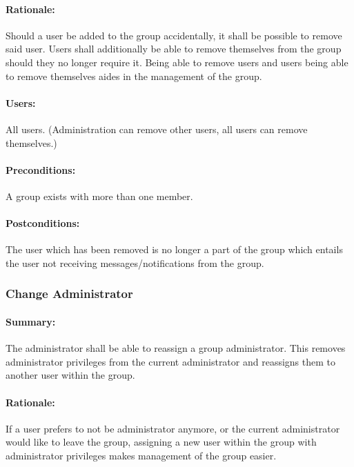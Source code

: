 \documentclass[11pt]{article}
\begin{document}
\paragraph{Rationale:}
Should a user be added to the group accidentally, it shall be possible to remove said user. Users shall additionally be able to remove themselves from the group should they no longer require it. Being able to remove users and users being able to remove themselves aides in the management of the group.
\paragraph{Users:}
All users. (Administration can remove other users, all users can remove themselves.)
\paragraph{Preconditions:}
A group exists with more than one member.
\paragraph{{Postconditions:}}
The user which has been removed is no longer a part of the group which entails the user not receiving messages/notifications from the group.

\subsubsection{Change Administrator} \label{UC-change-admin}
\paragraph{Summary:}
The administrator shall be able to reassign a group administrator. This removes administrator privileges from the current administrator and reassigns them to another user within the group.
\paragraph{Rationale:}
If a user prefers to not be administrator anymore, or the current administrator would like to leave the group, assigning a new user within the group with administrator privileges makes management of the group easier.
\end{document}

